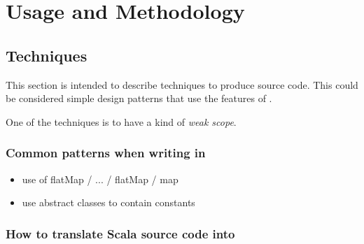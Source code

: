 \chapter{Usage and Methodology}


\section{Techniques}

This section is intended to describe techniques to produce \Soda source code.
This could be considered simple design patterns that use the features of \Soda.

One of the techniques is to have a kind of \textit{weak scope}.

\subsection{Common patterns when writing in \Soda}
\begin{itemize}
    \item use of flatMap / ... / flatMap / map
    \item use abstract classes to contain constants
\end{itemize}

\subsection{How to translate Scala source code into \Soda}

